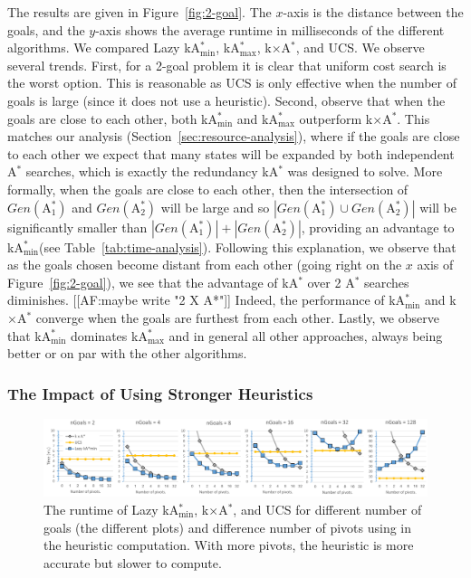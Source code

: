 \documentclass[twoside,11pt]{article}
\newcommand{\astar}{A$^*$\xspace}
\newcommand{\kastar}{kA$^*$\xspace}
\newcommand{\kastarvar}[1]{\textup{kA}$^*_{#1}$\xspace}
\newcommand{\kastarmin}{\kastarvar{\min}}
\newcommand{\kastarmax}{\kastarvar{\max}}
\newcommand{\kxastar}{k$\times$A$^*$\xspace}
\newcommand{\astari}[1]{A$^*_#1$\xspace}
\begin{document}
The results are given in Figure~\ref{fig:2-goal}.
The $x$-axis is the distance between the goals, and the $y$-axis shows the average runtime in milliseconds of the different algorithms.
We compared Lazy \kastarmin, \kastarmax, \kxastar, and UCS.
We observe several trends.
First, for a 2-goal problem it is clear that uniform cost search is the worst option.
This is reasonable as UCS is only effective when the number of goals is large (since it does not use a heuristic).
Second, observe that when the goals are close to each other, both \kastarmin and \kastarmax outperform \kxastar.
This matches our analysis (Section~\ref{sec:resource-analysis}), where if the goals are close to each other we expect that many states will be expanded by both independent \astar searches, which is  exactly the redundancy \kastar was designed to solve.
More formally, when the goals are close to each other, then the intersection of $Gen(\text{\astari{1}})$ and $Gen(\text{\astari{2}})$ will be large and so $|Gen(\text{\astari{1}})\cup Gen(\text{\astari{2}})|$ will be significantly smaller than $|Gen(\text{\astari{1}})|+|Gen(\text{\astari{2}})|$, providing an advantage to \kastarmin (see Table~\ref{tab:time-analysis}).
Following this explanation, we observe that as the goals chosen become distant from each other (going right on the $x$ axis of Figure~\ref{fig:2-goal}), we see that the advantage of \kastar over 2 \astar searches diminishes.  [[AF:maybe write  "2 X A*"]]
Indeed, the performance of \kastarmin and \kxastar converge when the goals are furthest from each other.
Lastly, we observe that \kastarmin dominates \kastarmax and in general all other approaches, always being better or on par with the other algorithms.

\subsubsection{The Impact of Using Stronger Heuristics}

\begin{figure}
  \includegraphics[width=\textwidth]{heuristic-power_cropped.pdf}
\caption{The runtime of Lazy \kastarmin, \kxastar, and UCS for different number of goals (the different plots) and difference number of pivots using in the heuristic computation.
With more pivots, the heuristic is more accurate but slower to compute.}
  \label{fig:dh-results}
\end{figure}
\end{document}
